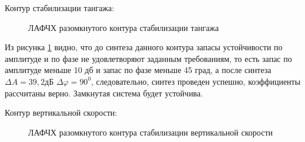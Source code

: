 \begin{center}
    Контур стабилизации тангажа:
\end{center}

\begin{figure}[H]
    \caption{ЛАФЧХ разомкнутого контура стабилизации тангажа}
    \label{fig:Тангаж раз qMIN}
\end{figure}

Из рисунка \ref{fig:Тангаж раз qMIN} видно, что до синтеза данного контура запасы устойчивости по амплитуде и по фазе не удовлетворяют заданным требованиям, то есть запас по амплитуде меньше 10 дб и запас по фазе меньше 45 град, а после синтеза $\Delta A = 39,2 $дБ $\Delta \varphi = 90^0$, следовательно, синтез проведен успешно, коэффициенты рассчитаны верно. Замкнутая система будет устойчива.  

\begin{center}
    Контур вертикальной скорости:
\end{center}

\begin{figure}[H]
    \caption{ЛАФЧХ разомкнутого контура стабилизации вертикальной скорости}
    \label{fig:Вертикальная скорость раз qMIN}
\end{figure}

